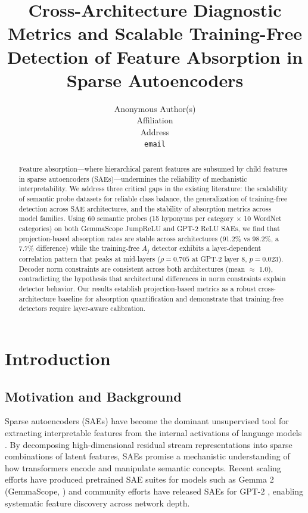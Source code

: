 \documentclass{article}
\title{Cross-Architecture Diagnostic Metrics and Scalable Training-Free Detection of Feature Absorption in Sparse Autoencoders}
\author{%
  Anonymous Author(s) \\
  Affiliation \\
  Address \\
  \texttt{email} \\
}
\begin{document}
\maketitle

\begin{abstract}
Feature absorption---where hierarchical parent features are subsumed by child features in sparse autoencoders (SAEs)---undermines the reliability of mechanistic interpretability. We address three critical gaps in the existing literature: the scalability of semantic probe datasets for reliable class balance, the generalization of training-free detection across SAE architectures, and the stability of absorption metrics across model families. Using 60 semantic probes (15 hyponyms per category $\times$ 10 WordNet categories) on both GemmaScope JumpReLU and GPT-2 ReLU SAEs, we find that projection-based absorption rates are stable across architectures (91.2\% vs 98.2\%, a 7.7\% difference) while the training-free $A_j$ detector exhibits a layer-dependent correlation pattern that peaks at mid-layers ($\rho = 0.705$ at GPT-2 layer 8, $p = 0.023$). Decoder norm constraints are consistent across both architectures (mean $\approx$ 1.0), contradicting the hypothesis that architectural differences in norm constraints explain detector behavior. Our results establish projection-based metrics as a robust cross-architecture baseline for absorption quantification and demonstrate that training-free detectors require layer-aware calibration.
\end{abstract}

\section{Introduction}

\subsection{Motivation and Background}

Sparse autoencoders (SAEs) have become the dominant unsupervised tool for extracting interpretable features from the internal activations of language models \citep{cunningham2023sparse, elhage2022superposition}. By decomposing high-dimensional residual stream representations into sparse combinations of latent features, SAEs promise a mechanistic understanding of how transformers encode and manipulate semantic concepts. Recent scaling efforts have produced pretrained SAE suites for models such as Gemma 2 (GemmaScope, \citealt{lieberum2024gemmascope}) and community efforts have released SAEs for GPT-2 \citep{templeton2024scaling, bloom2024saelens}, enabling systematic feature discovery across network depth.
\end{document}
